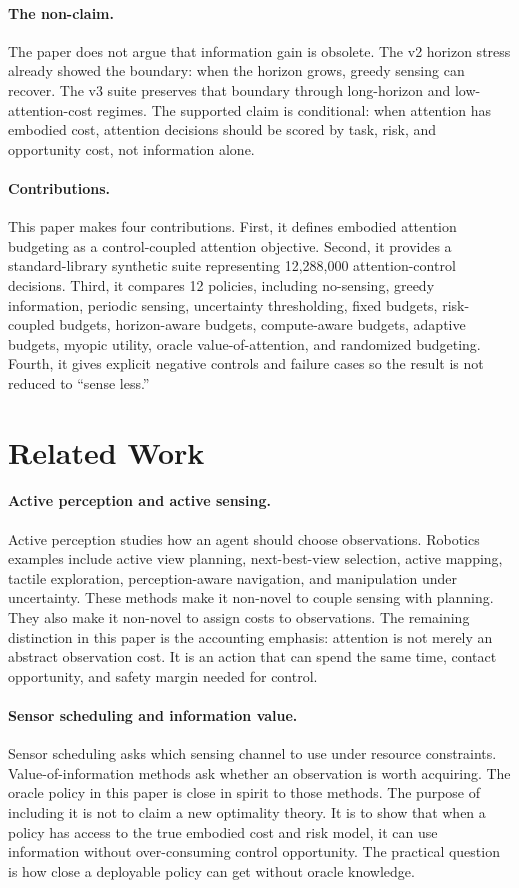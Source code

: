 \documentclass{article}
\begin{document}
\paragraph{The non-claim.}
The paper does not argue that information gain is obsolete. The v2 horizon
stress already showed the boundary: when the horizon grows, greedy sensing can
recover. The v3 suite preserves that boundary through long-horizon and
low-attention-cost regimes. The supported claim is conditional: when attention
has embodied cost, attention decisions should be scored by task, risk, and
opportunity cost, not information alone.

\paragraph{Contributions.}
This paper makes four contributions.
First, it defines embodied attention budgeting as a control-coupled attention
objective.
Second, it provides a standard-library synthetic suite representing
12,288,000 attention-control decisions.
Third, it compares 12 policies, including no-sensing, greedy information,
periodic sensing, uncertainty thresholding, fixed budgets, risk-coupled
budgets, horizon-aware budgets, compute-aware budgets, adaptive budgets,
myopic utility, oracle value-of-attention, and randomized budgeting.
Fourth, it gives explicit negative controls and failure cases so the result is
not reduced to ``sense less.''

\section{Related Work}

\paragraph{Active perception and active sensing.}
Active perception studies how an agent should choose observations. Robotics
examples include active view planning, next-best-view selection, active
mapping, tactile exploration, perception-aware navigation, and manipulation
under uncertainty. These methods make it non-novel to couple sensing with
planning. They also make it non-novel to assign costs to observations. The
remaining distinction in this paper is the accounting emphasis: attention is
not merely an abstract observation cost. It is an action that can spend the same
time, contact opportunity, and safety margin needed for control.

\paragraph{Sensor scheduling and information value.}
Sensor scheduling asks which sensing channel to use under resource constraints.
Value-of-information methods ask whether an observation is worth acquiring.
The oracle policy in this paper is close in spirit to those methods. The
purpose of including it is not to claim a new optimality theory. It is to show
that when a policy has access to the true embodied cost and risk model, it can
use information without over-consuming control opportunity. The practical
question is how close a deployable policy can get without oracle knowledge.
\end{document}
